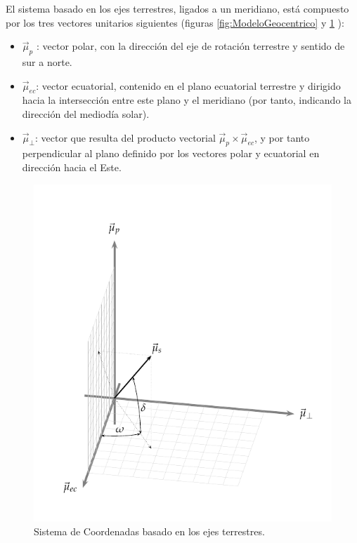 El sistema basado en los ejes terrestres, ligados a un meridiano,
está compuesto por los tres vectores unitarios siguientes (figuras
\ref{fig:ModeloGeocentrico} y \ref{fig:CoordenadasTerrestres}
): 
\begin{itemize}
\item $\vec{\mu}_{p}$ : vector polar, con la dirección del eje de rotación
terrestre y sentido de sur a norte.
\item $\vec{\mu}_{ec}$: vector ecuatorial, contenido en el plano ecuatorial
terrestre y dirigido hacia la intersección entre este plano y el meridiano
(por tanto, indicando la dirección del mediodía solar).
\item $\vec{\mu}_{\bot}$: vector que resulta del producto vectorial $\vec{\mu}_{p}\times\vec{\mu}_{ec}$,
y por tanto perpendicular al plano definido por los vectores polar
y ecuatorial en dirección hacia el Este.
\end{itemize}
%
\begin{figure}
\includegraphics[scale=0.9]{../figs/SistemaCoordenadasTerrestre}

\caption{Sistema de Coordenadas basado en los ejes terrestres.\label{fig:CoordenadasTerrestres}}

\end{figure}


